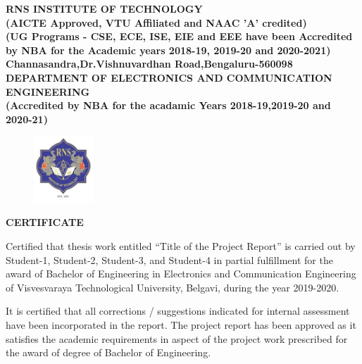 %
\setlength{\toptafiddle}{1in}
\setlength{\bottafiddle}{1in}
\vspace*{-0.5in}
\enlargethispage{\bottafiddle}
\thispagestyle{empty}


\begin{center}
\small\textbf{	RNS INSTITUTE OF TECHNOLOGY\\
(AICTE Approved, VTU Affiliated and NAAC 'A' credited)\\
(UG Programs - CSE, ECE, ISE, EIE and EEE have been Accredited by NBA for the Academic years 2018-19, 2019-20 and 2020-2021)\\
Channasandra,Dr.Vishnuvardhan Road,Bengaluru-560098\\
\vspace{0.3cm}
DEPARTMENT OF ELECTRONICS AND COMMUNICATION ENGINEERING\\
(Accredited by NBA for the acadamic Years 2018-19,2019-20 and 2020-21)
}
\end{center}

\begin{center}
\begin{figure}[h]
\centering
\includegraphics[height=2.5cm]{images/rns1.jpg}
\end{figure}
\Large{\textbf{CERTIFICATE}}
\end{center}

Certified that thesis work entitled ``Title of the Project Report'' is carried out by Student-1, Student-2, Student-3, and Student-4 in partial fulfillment for the award of Bachelor of Engineering in Electronics and Communication Engineering of Visvesvaraya Technological University, Belgavi, during the year 2019-2020. 


It is certified that all corrections / suggestions indicated for internal assessment have been incorporated in the report. The project report has been approved as it satisfies the academic requirements in aspect of the project work prescribed for the award of degree of Bachelor of Engineering.

